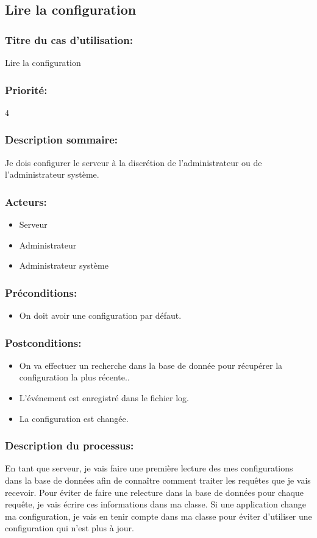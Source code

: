 \documentclass{scrreprt}
\begin{document}
\subsection{Lire la configuration}
\subsubsection{Titre du cas d'utilisation:} Lire la configuration
\subsubsection{Priorité:} 4
\subsubsection{Description sommaire:}Je dois configurer le serveur à la discrétion de l'administrateur ou de l'administrateur système. 
\subsubsection{Acteurs:}
\begin{itemize}
    \item Serveur
    \item Administrateur
    \item Administrateur système
\end{itemize}
\subsubsection{Préconditions:}
\begin{itemize}
    \item On doit avoir une configuration par défaut.
\end{itemize} 
\subsubsection{Postconditions:}
\begin{itemize}
    \item On va effectuer un recherche dans la base de donnée pour récupérer la configuration la plus récente..
    \item L'événement est enregistré dans le fichier log.
    \item La configuration est changée.

\end{itemize} 
\subsubsection{Description du processus:}En tant que serveur, je vais faire une première lecture des mes configurations dans la base de données afin de connaître comment traiter les requêtes que je vais recevoir.
Pour éviter de faire une relecture dans la base de données pour chaque requête,
je vais écrire ces informations dans ma classe.
Si une application change ma configuration, je vais en tenir compte dans ma
classe pour éviter d'utiliser une configuration qui n'est plus à jour.
\end{document}
